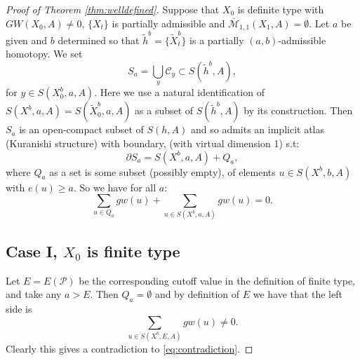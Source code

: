 \documentclass{amsart}
\numberwithin{equation}{section}
\theoremstyle{definition}
\theoremstyle{remark}
\DeclareMathOperator {\mult} {mult}
\begin{document}
\begin{proof} [Proof of Theorem \ref{thm:welldefined}]
Suppose that $X _{0} $ is definite type with $GW (X _{0}, A) \neq 0$, $\{X _{t} \}$ is partially admissible and
   $\overline {\mathcal{M}} _{1,1} (X _{1},A) = \emptyset $.
Let $a$  be given  and $b$ determined so that   $\widetilde{h} ^{b}=  \{\widetilde{X}  ^{b}_t   \} $
is a partially $(a,b)$-admissible homotopy.
We set $$  S _{a}  = \bigcup _{y} \mathcal{C} _{y} \subset S (\widetilde{h} ^{b},A),  $$  for $y \in S (X ^{b} _{0} ,a, A)$. Here we use a natural identification of $S (X ^{b}, a, A ) = S (\widetilde{X} ^{b}  _{0}, a, A)$ as a subset of $S (\widetilde{h} ^{b},A) $ by its construction.
Then $S _{a} $ is an open-compact subset of $S (h,A)$ and so admits an implicit atlas (Kuranishi structure) with boundary, (with virtual dimension 1) s.t:
\begin{equation*} 
\partial S _{a} = S (X ^{b}, a, A ) + Q _{a} ,
\end{equation*}
where $Q _{a} $ as a set is some subset (possibly empty), of elements $u \in S (X ^{b},b, A )$ with $e (u) \geq a$.
So we have for all $a$:
\begin{equation} \label{eq:contradiction}
\sum _{u \in Q _{a}} gw (u)  + \sum _{u \in S
(X ^{b}, a, A)} gw (u) = 0.
\end{equation}
\subsection {Case I, $X _{0} $ is finite type} Let $E=E (\mathcal{P})$ be the
corresponding cutoff value in the definition of finite type, and take any 
$a > E$.
Then $Q _{a} = \emptyset $ and by definition of $E$ we have that the left side is 
\begin{equation*}
\sum _{u \in S
(X ^{b}, E, A)} gw (u)  \neq 0.
\end {equation*}
Clearly this gives a contradiction to \eqref{eq:contradiction}.


\end{proof}
\end{document}
